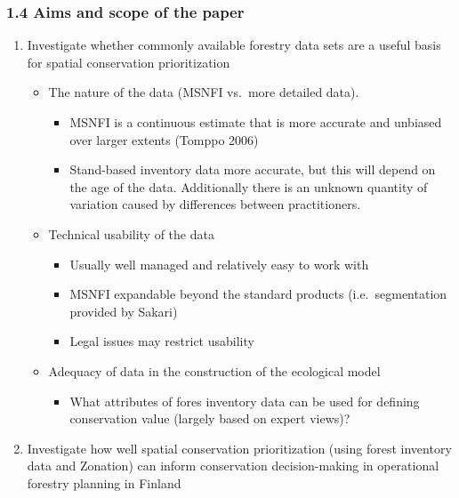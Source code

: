 \documentclass[]{article}
\begin{document}
\subsubsection{1.4 Aims and scope of the paper}

\begin{enumerate}
\def\labelenumi{\arabic{enumi}.}
\itemsep1pt\parskip0pt
\item
  Investigate whether commonly available forestry data sets are a useful
  basis for spatial conservation prioritization

  \begin{itemize}
  \itemsep1pt\parskip0pt
  \item
    The nature of the data (MSNFI vs.~more detailed data).

    \begin{itemize}
    \itemsep1pt\parskip0pt
    \item
      MSNFI is a continuous estimate that is more accurate and unbiased
      over larger extents (Tomppo 2006)
    \item
      Stand-based inventory data more accurate, but this will depend on
      the age of the data. Additionally there is an unknown quantity of
      variation caused by differences between practitioners.
    \end{itemize}
  \item
    Technical usability of the data

    \begin{itemize}
    \itemsep1pt\parskip0pt
    \item
      Usually well managed and relatively easy to work with
    \item
      MSNFI expandable beyond the standard products (i.e.~segmentation
      provided by Sakari)
    \item
      Legal issues may restrict usability
    \end{itemize}
  \item
    Adequacy of data in the construction of the ecological model

    \begin{itemize}
    \itemsep1pt\parskip0pt
    \item
      What attributes of fores inventory data can be used for defining
      conservation value (largely based on expert views)?
    \end{itemize}
  \end{itemize}
\item
  Investigate how well spatial conservation prioritization (using forest
  inventory data and Zonation) can inform conservation decision-making
  in operational forestry planning in Finland


\end{enumerate}
\end{document}

